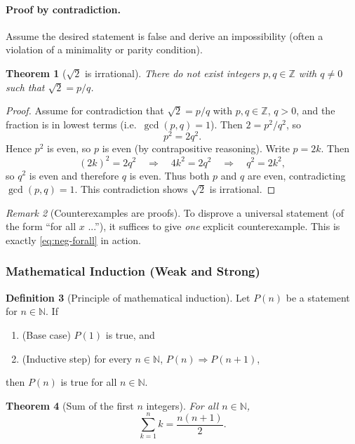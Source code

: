 \documentclass[12pt]{article}
\numberwithin{equation}{section}
\newcommand{\ZZ}{\mathbb{Z}}
\newcommand{\NN}{\mathbb{N}}
\theoremstyle{plain}
\newtheorem{theorem}{Theorem}[section]
\theoremstyle{definition}
\newtheorem{definition}[theorem]{Definition}
\theoremstyle{remark}
\newtheorem{remark}[theorem]{Remark}
\begin{document}
\paragraph{Proof by contradiction.}
Assume the desired statement is false and derive an impossibility (often a violation of a minimality or parity condition).

\begin{theorem}[$\sqrt{2}$ is irrational]\label{thm:sqrt2}
There do not exist integers $p,q\in\ZZ$ with $q\neq 0$ such that $\sqrt{2}=p/q$.
\end{theorem}
\begin{proof}
Assume for contradiction that $\sqrt{2}=p/q$ with $p,q\in\ZZ$, $q>0$, and the fraction is in lowest terms (i.e.\ $\gcd(p,q)=1$).  
Then $2 = p^2/q^2$, so
\[
p^2 = 2q^2.
\]
Hence $p^2$ is even, so $p$ is even (by  contrapositive reasoning). Write $p=2k$. Then
\[
(2k)^2 = 2q^2 \quad \Rightarrow\quad 4k^2 = 2q^2 \quad \Rightarrow\quad q^2 = 2k^2,
\]
so $q^2$ is even and therefore $q$ is even. Thus both $p$ and $q$ are even, contradicting $\gcd(p,q)=1$.  
This contradiction shows $\sqrt{2}$ is irrational.
\end{proof}

\begin{remark}[Counterexamples are proofs]
To disprove a universal statement (of the form ``for all $x$ ...''), it suffices to give \emph{one} explicit counterexample.  
This is exactly \cref{eq:neg-forall} in action.
\end{remark}

\subsubsection{Mathematical Induction (Weak and Strong)}

\begin{definition}[Principle of mathematical induction]
Let $P(n)$ be a statement for $n\in\NN$. If
\begin{enumerate}
  \item (Base case) $P(1)$ is true, and
  \item (Inductive step) for every $n\in\NN$, $P(n)\Rightarrow P(n+1)$,
\end{enumerate}
then $P(n)$ is true for all $n\in\NN$.
\end{definition}

\begin{theorem}[Sum of the first $n$ integers]\label{thm:sum-n}
For all $n\in\NN$,
\[
\sum_{k=1}^{n} k = \frac{n(n+1)}{2}.
\]
\end{theorem}
\end{document}
